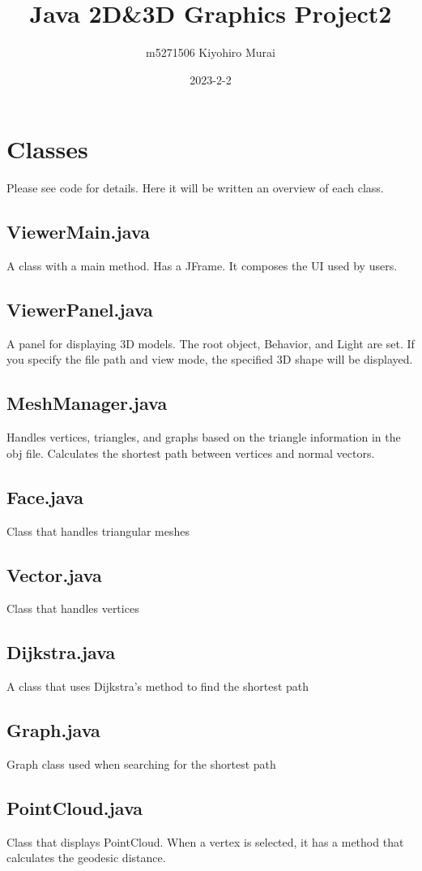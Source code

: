 \documentclass[12pt]{article}
\title{Java 2D\&3D Graphics Project2}
\author{m5271506 Kiyohiro Murai}
\date{2023-2-2}
\begin{document}
\maketitle
\tableofcontents
\newpage

\section{Classes}
Please see code for details. Here it will be written an overview of each class.
\subsection{ViewerMain.java}
A class with a main method. Has a JFrame. It composes the UI used by users.
\subsection{ViewerPanel.java}
A panel for displaying 3D models. The root object, Behavior, and Light are set.
If you specify the file path and view mode, the specified 3D shape will be
displayed.

\subsection{MeshManager.java}
Handles vertices, triangles, and graphs based on the triangle information in
the obj file. Calculates the shortest path between vertices and normal vectors.

\subsection{Face.java}
Class that handles triangular meshes
\subsection{Vector.java}
Class that handles vertices
\subsection{Dijkstra.java}
A class that uses Dijkstra's method to find the shortest path
\subsection{Graph.java}
Graph class used when searching for the shortest path
\subsection{PointCloud.java}
Class that displays PointCloud. When a vertex is selected, it has a method that
calculates the geodesic distance.
\end{document}
